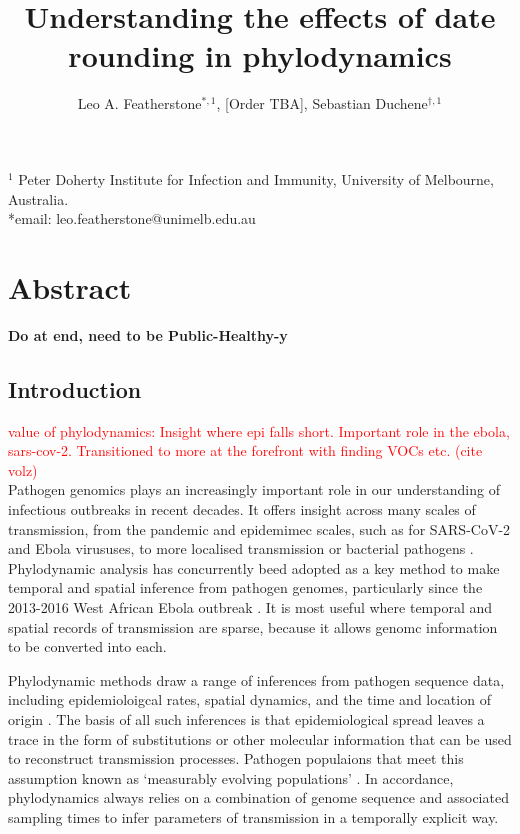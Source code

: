 \documentclass{article}
\title{Understanding the effects of date rounding in phylodynamics}
\author{Leo A. Featherstone$^{\ast,1}$, [Order TBA], Sebastian Duchene$^{\dagger,1}$}
\begin{document}
\maketitle
\linenumbers
$^{1}$ Peter Doherty Institute for Infection and Immunity, University of Melbourne, Australia.\\
*email: leo.featherstone@unimelb.edu.au

\section*{Abstract}
\textbf{Do at end, need to be Public-Healthy-y}

\begin{spacing}{1.5}
\section*{Introduction}

\textcolor{red}{value of phylodynamics: Insight where epi falls short. Important role in the ebola, sars-cov-2.  Transitioned to more at the forefront with finding VOCs etc. (cite volz)}\\
Pathogen genomics plays an increasingly important role in our understanding of infectious outbreaks in recent decades. It offers insight across many scales of transmission, from the pandemic and epidemimec scales, such as for SARS-CoV-2 and Ebola virususes, to more localised transmission or bacterial pathogens \citep{lancet2021genomic}. Phylodynamic analysis has concurrently beed adopted as a key method to make temporal and spatial inference from pathogen genomes, particularly since the 2013-2016 West African Ebola outbreak \citep{mbala2019medical}. It is most useful where temporal and spatial records of transmission are sparse, because it allows genomc information to be converted into each.

Phylodynamic methods draw a range of inferences from pathogen sequence data, including epidemioloigcal rates, spatial dynamics, and the time and location of origin \citep{featherstone2022epidemiological, attwood2022phylogenetic, du2015getting}. The basis of all such inferences is that epidemiological spread leaves a trace in the form of substitutions or other molecular information that can be used to reconstruct transmission processes. Pathogen populaions that meet this assumption known as `measurably evolving populations' \citep{drummond2003measurably, biek_measurably_2015}. In accordance, phylodynamics always relies on a combination of genome sequence and associated sampling times to infer parameters of transmission in a temporally explicit way.


\end{spacing}
\end{document}
